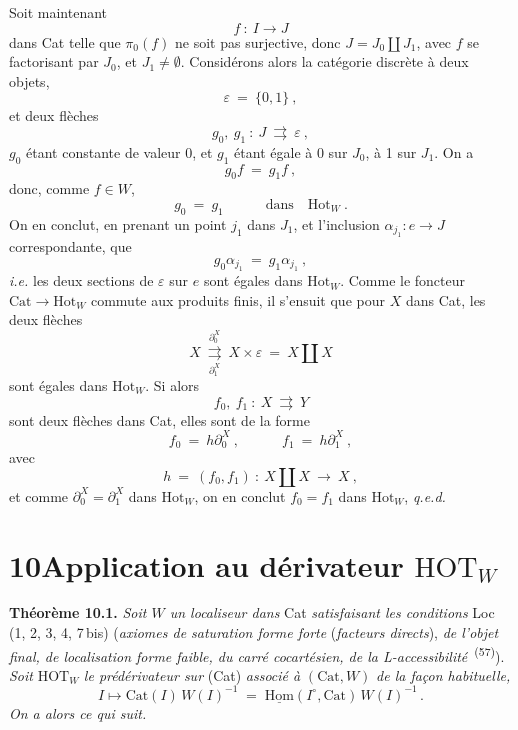 \documentclass[11pt]{article}
\newcommand{\printedpage}[1]{\marginpar{\footnotesize p.~#1}}
\newcommand{\msp}[1]{\marginpar{\footnotesize [#1]}}
\newcommand{\Cat}{\mathrm{Cat}}
\newcommand{\Hot}{\mathrm{Hot}}
\newcommand{\HOT}{\mathrm{HOT}}
\begin{document}
Soit maintenant
\[
f\ :\ I\longrightarrow J
\]
dans Cat telle que $\pi_0(f)$ ne soit pas surjective, donc $J=J_0\amalg J_1$, avec $f$ se factorisant par $J_0$, et $J_1\neq\emptyset$. Considérons alors la catégorie discrète à deux objets,
\[
\varepsilon\ =\ \{0,1\}\ ,
\]
et deux flèches
\[
g_0,\ g_1\ :\ J\ \rightrightarrows\ \varepsilon\ ,
\]
$g_0$ étant constante de valeur 0, et $g_1$ étant égale à 0 sur $J_0$, à 1 sur $J_1$. On a
\[
g_0f\ =\ g_1f\ ,
\]
donc, comme $f\in W$,
\[
g_0\ =\ g_1\qquad\quad\text{dans}\quad\Hot_W\ .
\]
On en conclut, en prenant un point $j_1$ dans $J_1$, et l'inclusion $\alpha_{j_1}:e\longrightarrow J$ correspondante, que
\msp{page 133 quinquies}
\[
g_0\alpha_{j_1}\ =\ g_1\alpha_{j_1}\ ,
\]
\textit{i.e.} les deux sections de $\varepsilon$ sur $e$ sont égales dans $\Hot_W$. Comme le foncteur $\Cat\longrightarrow\Hot_W$ commute aux produits finis, il s'ensuit que pour $X$ dans Cat, les deux flèches
\[
X\ \underset{\partial_1^X}{\overset{\partial_0^X}{\rightrightarrows}}\ X\times\varepsilon\ =\ X\amalg X
\]
sont égales dans $\Hot_W$. Si alors
\[
f_0,\ f_1\ :\ X\ \rightrightarrows\ Y
\]
sont deux flèches dans Cat, elles sont de la forme
\[
f_0\ =\ h\partial_0^X\ ,\qquad\quad f_1\ =\ h\partial_1^X\ ,
\]
avec
\[
h\ =\ (f_0,f_1)\ :\ X\amalg X\ \longrightarrow\ X\ , %
\]
et comme $\partial_0^X=\partial_1^X$ dans $\Hot_W$, on en conclut $f_0=f_1$ dans $\Hot_W$, \quad \textit{q.e.d.}

\printedpage{74}

\msp{page 134}

\section*{10\quad Application au dérivateur $\HOT_W$}

\textbf{Théorème 10.1.} \textit{Soit $W$ un localiseur dans} Cat \textit{satisfaisant les conditions} Loc\,(1, 2, 3, 4, 7\,bis) (\textit{axiomes de saturation forme forte} (\textit{facteurs directs}), \textit{de l'objet final, de localisation forme faible, du carré cocartésien, de la L-accessibilité}~\textsuperscript{(57)}). \textit{Soit} $\HOT_W$ \textit{le prédérivateur sur} (Cat) \textit{associé à} $(\mathrm{Cat}, W)$ \textit{de la façon habituelle,}
\[
I \longmapsto \mathrm{Cat}(I)\,W(I)^{-1} \;=\; \underline{\mathrm{Hom}}(I^{\circ}, \mathrm{Cat})\,W(I)^{-1}\,. \tag*{(10.1.1)}
\]
\textit{On a alors ce qui suit.}
\end{document}
